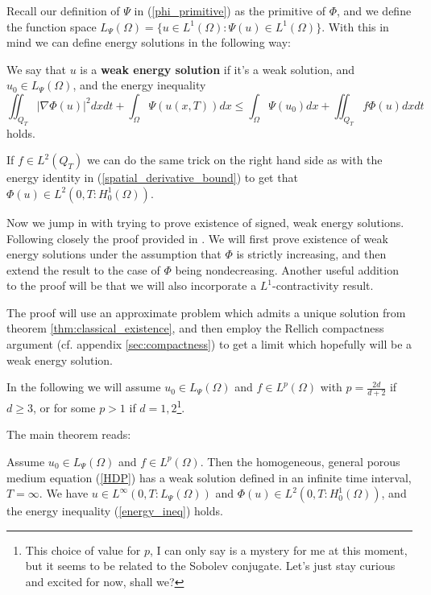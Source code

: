 \documentclass[11pt, a4paper]{article}
\begin{document}
Recall our definition of $\Psi$ in (\ref{phi_primitive}) as the primitive of $\Phi$,
and we define the function space $L_\Psi(\Omega) = \{ u\in L^1(\Omega): \Psi(u)\in L^1(\Omega)\}$.
With this in mind we can define energy solutions in the following way:
\begin{mydef}
We say that $u$ is a \textbf{weak energy solution} if it's a weak solution, and $u_0 \in L_\Psi(\Omega)$, and the energy inequality
\begin{equation}
\label{energy_ineq}
\iint_{Q_T} |\nabla \Phi(u)|^2 dxdt + \int_\Omega \Psi(u(x,T))dx \leq \int_\Omega \Psi(u_0)dx + \iint_{Q_T}f\Phi(u)dxdt
\end{equation}
holds.
\end{mydef}
\setcounter{obs}{0}
\begin{obs}
If $f\in L^2(Q_T)$ we can do the same trick on the right hand side as with the energy identity in (\ref{spatial_derivative_bound}) to get that $\Phi(u) \in L^2(0,T: H_0^1(\Omega))$.
\end{obs}

Now we jump in with trying to prove existence of signed, weak energy solutions. Following closely the proof provided in \citep{vazquez2007porous}. We will first prove existence of weak energy solutions under the assumption that $\Phi$ is strictly increasing, and then extend the result to the case of $\Phi$ being nondecreasing. Another useful addition to the proof will be that we will also incorporate a $L^1$-contractivity result.

The proof will use an approximate problem which admits a unique solution from theorem \ref{thm:classical_existence}, and then employ the Rellich compactness argument (cf. appendix \ref{sec:compactness}) to get a limit which hopefully will be a weak energy solution.

In the following we will assume $u_0 \in L_\Psi(\Omega)$ and $f\in L^p(\Omega)$ with $p = \frac{2d}{d+2}$ if $d \geq 3$, or for some $p>1$ if $d=1,2$\footnote{This choice of value for $p$, I can only say is a mystery for me at this moment, but it seems to be related to the Sobolev conjugate. Let's just stay curious and excited for now, shall we?}.

The main theorem reads:
\begin{theorem}
\label{thm:weak_existence}
Assume $u_0 \in L_\Psi(\Omega)$ and $f \in L^p (\Omega)$. Then the homogeneous, general porous medium equation (\ref{HDP}) has a weak solution defined in an infinite time interval, $T=\infty$. We have $u \in L^\infty(0,T:L_\Psi(\Omega))$ and $\Phi(u) \in L^2(0,T:H_0^1(\Omega))$, and the energy inequality (\ref{energy_ineq}) holds.
\end{theorem}
\end{document}
